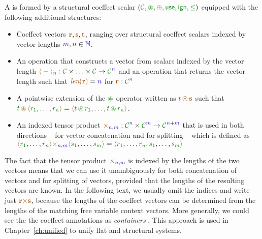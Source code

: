 \begin{definition}
A \emph{} is formed by a structural coeffect scalar
$(\C, \cseq, \cpar, \cunit, \czero, \cleq)$ equipped with the following additional structures:

\begin{itemize}
\item Coeffect vectors $\aclrd{\textbf{r}}, \aclrd{\textbf{s}}, \aclrd{\textbf{t}}$, ranging over
  structural coeffect scalars indexed by vector lengths $\sclrd{m}, \sclrd{n} \in \sclrd{\mathbb{N}}$.

\item An operation that constructs a vector from scalars indexed by the vector length
  $\alift{-}_{\sclrd{n}} : \C \times \ldots \times \C \rightarrow \C^{\sclrd{n}}$
  and an operation that returns the vector length such that
  $\alen{\aclrd{\textbf{r}}} = \sclrd{n}$ for $\aclrd{\textbf{r}} : \C^{\sclrd{n}}$

\item A pointwise extension of the $\cseq$ operator written as $\cclrd{t} \,\aseq\, \aclrd{\textbf{s}}$
  such that\\ $\cclrd{t} \,\aseq\, \alift{\cclrd{r_1}, \ldots, \cclrd{r_n}} =
    \alift{\cclrd{t} \,\cseq\,\cclrd{r_1}, \ldots, \cclrd{t} \,\cseq\,\cclrd{r_n}}$.

\item An indexed tensor product $\atimes_{\sclrd{n},\sclrd{m}} : \C^{\sclrd{n}} \times \C^{\sclrd{m}} \rightarrow \C^{\sclrd{n}+\sclrd{m}}$
  that is used in both directions -- for vector concatenation and for splitting --
  which is defined as $\alift{\cclrd{r_1}, \ldots, \cclrd{r_n}}
     \atimes_{\sclrd{n}, \sclrd{m}} \alift{\cclrd{s_1}, \ldots, \cclrd{s_m}}
   = \alift{\cclrd{r_1}, \ldots, \cclrd{r_n}, \cclrd{s_1}, \ldots, \cclrd{s_m}}$
\end{itemize}
\end{definition}

\noindent
The fact that the tensor product $\atimes_{\sclrd{n},\sclrd{m}}$ is indexed by the lengths
of the two vectors means that we can use it unambiguously for both concatenation of vectors
and for splitting of vectors, provided that the lengths of the resulting vectors are known.
In the following text, we usually omit the indices and write just
$\aclrd{\textbf{r}} \atimes \aclrd{\textbf{s}}$, because the lengths of the coeffect vectors
can be determined from the lengths of the matching free variable context vectors.
More generally, we could see the the coeffect annotations as \emph{containers}
\cite{types-containers}. This approach is used in Chapter~\ref{ch:unified} to unify flat
and structural systems.

